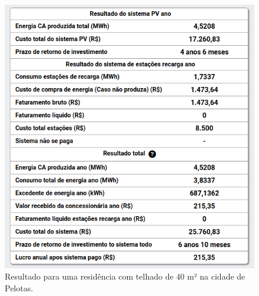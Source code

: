 \begin{figure}[H]
    \centering
    \includegraphics[width=1\textwidth]{./Figuras/casa_minha_2_3.png}
    \caption{Resultado para uma residência com telhado de 40 m² na cidade de Pelotas.}
   \label{fig:casa_minha_2_3}
\end{figure}
